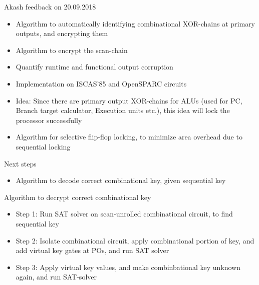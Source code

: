 \begin{frame}{Akash feedback on 20.09.2018}
\begin{itemize}
\item Algorithm to automatically identifying combinational XOR-chains at primary outputs, and encrypting them
\item Algorithm to encrypt the scan-chain
\item Quantify runtime and functional output corruption
\item Implementation on ISCAS'85 and OpenSPARC circuits
\item \alert{Idea}: Since there are primary output XOR-chains for ALUs (used for PC, Branch target calculator, Execution units etc.), this idea will lock the processor successfully
\item Algorithm for selective flip-flop locking, to minimize area overhead due to sequential locking
\end{itemize}
\end{frame}

\begin{frame}{Next steps}
\begin{itemize}
\item Algorithm to decode correct combinational key, given sequential key
\end{itemize}
\end{frame}

\begin{frame}{Algorithm to decrypt correct combinational key}
\begin{itemize}
\item Step 1: Run SAT solver on scan-unrolled combinational circuit, to find sequential key
\item Step 2: Isolate combinational circuit, apply combinational portion of key, and add virtual key gates at POs, and run SAT solver
\item Step 3: Apply virtual key values, and make combinbational key unknown again, and run SAT-solver
\end{itemize}
\end{frame}

